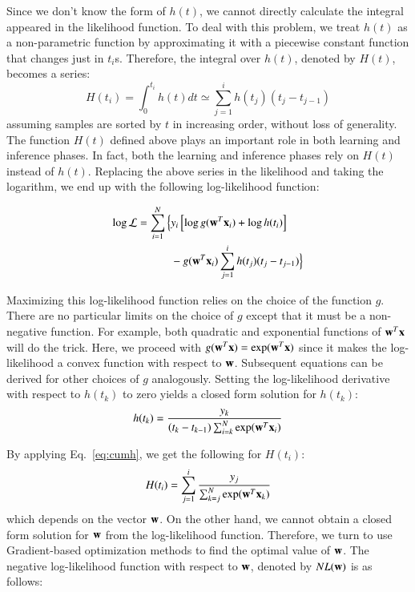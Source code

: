 Since we don't know the form of $h(t)$, we cannot directly calculate the integral appeared in the likelihood function. To deal with this problem, we treat $h(t)$ as a non-parametric function by approximating it with a piecewise constant function that changes just in $t_i$s. Therefore, the integral over $h(t)$, denoted by $H(t)$, becomes a series:
\begin{equation}\label{eq:cumh}
H(t_i)=\int_{0}^{t_i}h(t)dt \simeq \sum_{j=1}^{i}h(t_j)(t_j-t_{j-1})
\end{equation}
assuming samples are sorted by $t$ in increasing order, without loss of generality. The function $H(t)$ defined above plays an important role in both learning and inference phases. In fact, both the learning and inference phases rely on $H(t)$ instead of $h(t)$.
Replacing the above series in the likelihood and taking the logarithm, we end up with the following log-likelihood function:

\begin{equation}\label{eq:logl}
\begin{split}
\log\mathcal{L}
=\sum_{i=1}^{N}\Big\lbrace& y_i\left[\log g(\mb{w}^T\mb{x}_i) + \log h(t_i)\right]\\&-g(\mb{w}^T\mb{x}_i)\sum_{j=1}^{i}h(t_j)(t_j-t_{j-1})\Big\rbrace\\
\end{split}
\end{equation}

Maximizing this log-likelihood function relies on the choice of the function $g$. There are no particular limits on the choice of $g$ except that it must be a non-negative function. For example, both quadratic and exponential functions of $\mathbf{w}^T\mathbf{x}$ will do the trick. Here, we proceed with $g(\mathbf{w}^T\mathbf{x})=\exp(\mathbf{w}^T\mathbf{x})$ since it makes the log-likelihood a convex function with respect to $\mathbf{w}$. Subsequent equations can be derived for other choices of $g$ analogously. Setting the log-likelihood derivative with respect to $h(t_k)$ to zero yields a closed form solution for $h(t_k)$:
\begin{equation}\label{eq:h}
h(t_k)=\frac{y_k}{(t_k-t_{k-1})\sum_{i=k}^{N}\exp(\mb{w}^T\mb{x}_i)}
\end{equation}

By applying Eq.~\ref{eq:cumh}, we get the following for $H(t_i)$:
\begin{equation}\label{eq:H}
H(t_i)=\sum_{j=1}^{i}\frac{y_j}{\sum_{k=j}^{N}\exp(\mb{w}^T\mb{x}_k)}
\end{equation}
which depends on the vector $\mathbf{w}$. On the other hand, we cannot obtain a closed form solution for $\mathbf{w}$ from the log-likelihood function. Therefore, we turn to use Gradient-based optimization methods to find the optimal value of $\mathbf{w}$. The negative log-likelihood function with respect to $\mathbf{w}$, denoted by $NL(\mathbf{w})$ is as follows:

